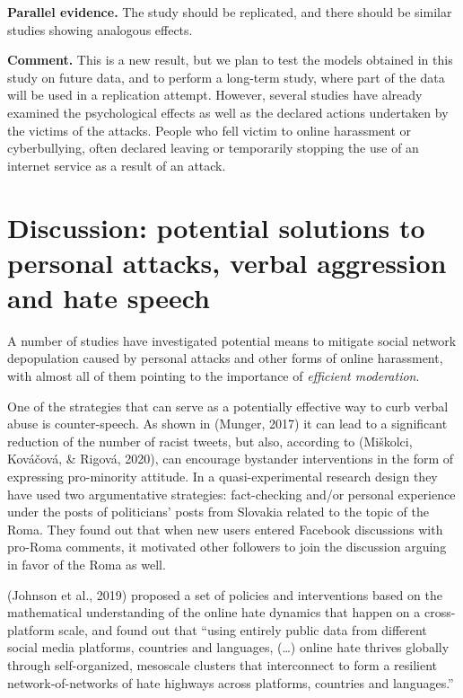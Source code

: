 \documentclass[
  10pt,
  dvipsnames]{scrartcl}
\begin{document}
\begin{description}
\item \textbf{Parallel evidence.} The study should be replicated, and there should be similar studies showing analogous effects. 


\textbf{Comment.} This is a new result, but we plan to test the models obtained in this study on future data, and to perform a long-term study, where part of the data will be used in a replication attempt. However, several studies have already examined the psychological effects as well as the declared actions undertaken by the victims of the attacks. People who fell victim to online harassment or cyberbullying, often  declared leaving or temporarily stopping the use of an internet service as a result of an attack. 




\end{description}

\section{Discussion: potential solutions to personal attacks, verbal aggression and hate speech}
\label{discussion}

A number of studies have investigated potential means to mitigate social
network depopulation caused by personal attacks and other forms of
online harassment, with almost all of them pointing to the importance of
\textit{efficient moderation}.

One of the strategies that can serve as a potentially effective way to
curb verbal abuse is counter-speech. As shown in (Munger, 2017) it can
lead to a significant reduction of the number of racist tweets, but
also, according to (Miškolci, Kováčová, \& Rigová, 2020), can encourage
bystander interventions in the form of expressing pro-minority attitude.
In a quasi-experimental research design they have used two argumentative
strategies: fact-checking and/or personal experience under the posts of
politicians' posts from Slovakia related to the topic of the Roma. They
found out that when new users entered Facebook discussions with pro-Roma
comments, it motivated other followers to join the discussion arguing in
favor of the Roma as well.

(Johnson et al., 2019) proposed a set of policies and interventions
based on the mathematical understanding of the online hate dynamics that
happen on a cross-platform scale, and found out that ``using entirely
public data from different social media platforms, countries and
languages, (\dots) online hate thrives globally through self-organized,
mesoscale clusters that interconnect to form a resilient
network-of-networks of hate highways across platforms, countries and
languages.''
\end{document}
